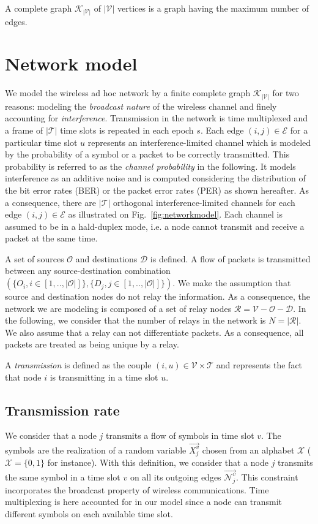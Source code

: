 \documentclass[a4paper]{article}
\newcommand{\T}{\mathcal{T}}
\newcommand{\X}{\mathcal{X}}
\newcommand{\V}{\mathcal{V}}
\newcommand{\Orig}{\mathcal{O}}
\newcommand{\D}{\mathcal{D}}
\newcommand{\E}{\mathcal{E}}
\newcommand{\R}{\mathcal{R}}
\newcommand{\Nout}[2]{ \overrightarrow{ \mathcal{N}_{#1}^{#2} } }
\begin{document}
A complete graph $\mathcal{K_{|\V|}}$ of $|\V|$ vertices is a graph having the maximum number of edges. 






\section{Network model}\label{sec:networkmodel}

We model the wireless ad hoc network by a finite complete graph $\mathcal{K_{|\V|}}$ for two reasons: modeling the \emph{broadcast nature} of the wireless channel and finely accounting for \emph{interference}.
Transmission in the network is time multiplexed and a frame of $|\T|$ time slots is repeated in each epoch $s$. 
Each edge $(i,j) \in \E$ for a particular time slot $u$ represents an interference-limited channel which is modeled by the probability of a symbol or a packet to be correctly transmitted. This probability is referred to as the \emph{channel probability} in the following. It models interference as an additive noise and is computed considering the distribution of the bit error rates (BER) or the packet error rates (PER) as shown hereafter. As a consequence, there are  $|\T|$ orthogonal interference-limited channels for each edge $(i,j) \in \E$ as illustrated on Fig.~\ref{fig:networkmodel}.
Each channel is assumed to be in a hald-duplex mode, i.e. a node cannot transmit and receive a packet at the same time. 



A set of sources $\Orig$ and destinations $\D$ is defined. A flow of packets is transmitted between any source-destination combination $(\{O_i, i \in \left[1,..,|\Orig| \right]\},\{D_j, j \in \left[1,..,|\Orig| \right]\})$. 
We make the assumption that source and destination nodes do not relay the information. As a consequence, the network we are modeling is composed of a set of relay nodes $\R = \V-\Orig-\D$. In the following, we consider that the number of relays in the network is $N = |\R|$. We also assume that a relay can not differentiate packets. As a consequence, all packets are treated as being unique by a relay.

A \emph{transmission} is defined as the couple $(i,u) \in \V \times \T$ and represents the fact that node $i$ is transmitting in a time slot $u$.



\subsection{Transmission rate}
We consider that a node $j$ transmits a flow of symbols in time slot $v$. The symbols are the realization of a random variable $\overrightarrow{X_j^v}$ chosen from an alphabet $\X$ ($\X=\{0,1\}$ for instance). With this definition, we consider that a node $j$ transmits the same symbol in a time slot $v$ on all its outgoing edges $\Nout{j}{v}$. This constraint incorporates the broadcast property of wireless communications. Time multiplexing is here accounted for in our model since a node can transmit different symbols on each available time slot. 
 
\end{document}
